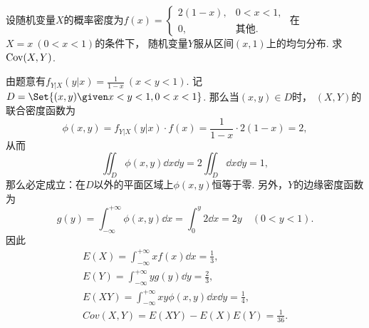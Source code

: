 \begin{example}
设随机变量\(X\)的概率密度为\(f(x) = \left\{ \begin{array}{cl}
	2(1-x), & 0<x<1, \\
	0, & \text{其他}.
\end{array} \right.\)
在\(X=x\ (0<x<1)\)的条件下，
随机变量\(Y\)服从区间\((x,1)\)上的均匀分布.
求\(\operatorname{Cov}(X,Y)\).
\begin{solution}
由题意有\(f_{Y \vert X}(y \vert x) = \frac1{1-x}\ (x<y<1)\).
记\(D = \Set{ (x,y) \given x<y<1,0<x<1 }\).
那么当\((x,y) \in D\)时，
\((X,Y)\)的联合密度函数为\begin{equation*}
	\phi(x,y) = f_{Y \vert X}(y \vert x) \cdot f(x)
	= \frac1{1-x} \cdot 2(1-x)
	= 2,
\end{equation*}
从而\begin{equation*}
	\iint_D \phi(x,y) \dd{x}\dd{y}
	= 2 \iint_D \dd{x}\dd{y}
	= 1,
\end{equation*}
那么必定成立：在\(D\)以外的平面区域上\(\phi(x,y)\)恒等于零.
另外，\(Y\)的边缘密度函数为\begin{equation*}
	g(y) = \int_{-\infty}^{+\infty} \phi(x,y) \dd{x}
	= \int_0^y 2 \dd{x}
	= 2y
	\quad(0<y<1).
\end{equation*}
因此\begin{gather*}
	E(X) = \int_{-\infty}^{+\infty} x f(x) \dd{x}
	= \frac13, \\
	E(Y) = \int_{-\infty}^{+\infty} y g(y) \dd{y}
	= \frac23, \\
	E(XY) = \int_{-\infty}^{+\infty} x y \phi(x,y) \dd{x}\dd{y}
	= \frac14, \\
	Cov(X,Y) = E(XY) - E(X) E(Y)
	= \frac1{36}.
\end{gather*}
\end{solution}
\end{example}

